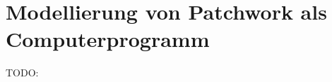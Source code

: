 \chapter{Modellierung von Patchwork als Computerprogramm}
\label{chapter:modellierung-von-patchwork-als-computerprogramm}

TODO:

